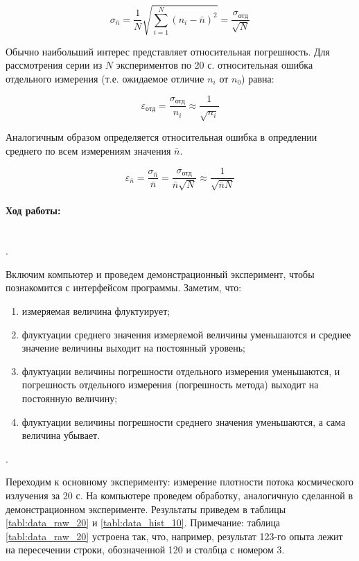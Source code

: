 \documentclass[a4paper, 12pt]{article}
\newcommand{\parag}[1]{\paragraph*{#1:}}
\newcounter{Points}
\newcommand{\point}{\arabic{Points}. \addtocounter{Points}{1}}
\begin{document}
\begin{equation} \label{eq:6}
    \sigma_{\bar{n}} = \frac{1}{N} \sqrt {\sum_{i=1}^N ({n_i - \bar{n}})^2} = \frac {\sigma_{отд}}{\sqrt {N}}
\end{equation}

Обычно наибольший интерес представляет относительная погрешность. Для рассмотрения серии из $N$ экспериментов по 20 с. относительная ошибка отдельного измерения (т.е. ожидаемое отличие $n_i$ от $n_0$) равна:

\begin{equation} \label{eq:7}
   \varepsilon_{отд} = \frac {\sigma_{отд}}{n_i} \approx \frac {1}{\sqrt {n_i}}
\end{equation}

Аналогичным образом определяется относительная ошибка в опредлении среднего по всем измерениям значения $\bar{n}$.

\begin{equation} \label{eq:8}
    \varepsilon_{\bar{n}} = \frac {\sigma_{\bar{n}}}{\bar{n}} = \frac {\sigma_{отд}}{\bar{n} \sqrt {N}} \approx \frac {1}{\sqrt {\bar {n} N}}
\end{equation}

\parag {Ход работы} ~\\

\point Включим компьютер и проведем демонстрационный эксперимент, чтобы познакомится с интерфейсом программы. Заметим, что:
\begin{enumerate}
    \item измеряемая величина флуктуирует;
    \item флуктуации среднего значения измеряемой величины уменьшаются и среднее значение величины выходит на постоянный уровень;
    \item флуктуации величины погрешности отдельного измерения уменьшаются, и погрешность отдельного измерения (погрешность метода) выходит на постоянную величину;
    \item флуктуации величины погрешности среднего значения уменьшаются, а сама величина убывает.   
\end{enumerate}


\point Переходим к основному эксперименту: измерение плотности потока космического излучения за 20 с. На компьютере проведем обработку, аналогичную сделанной в демонстрационном эксперименте. Результаты приведем в таблицы \ref{tabl:data_raw_20} и \ref{tabl:data_hist_10}. Примечание: таблица \ref{tabl:data_raw_20} устроена так, что, например, результат 123-го опыта лежит на пересечении строки, обозначенной 120 и столбца с номером 3.
\end{document}
